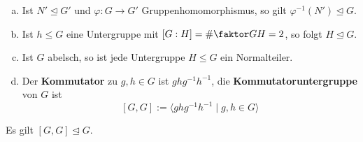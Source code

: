 \documentclass[a4paper]{report}
\begin{document}
\begin{ubng} \item
  \begin{enumerate}[(a)]
          \item Ist $N' \trianglelefteq G'$ und $\varphi : G \to G'$ Gruppenhomomorphismus, so gilt $\varphi^{-1}(N') \trianglelefteq G$.
    \item Ist $h \le G$ eine Untergruppe mit $[G:H] = \# \faktor GH= 2$, so folgt $H \trianglelefteq G$.
    \item Ist $G$ abelsch, so ist jede Untergruppe $H \le G$ ein Normalteiler.
    \item Der \textbf{Kommutator} zu $g, h \in G$ ist $ghg^{-1}h^{-1}$, die \textbf{Kommutatoruntergruppe} von $G$ ist $$[G, G]:= \langle ghg^{-1}h^{-1} \mid g, h \in G \rangle$$
\end{enumerate}
Es gilt $[G, G] \trianglelefteq G.$
\end{ubng}
\end{document}
